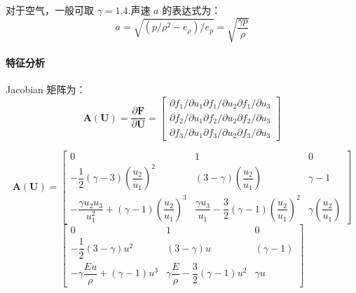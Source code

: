 \documentclass{article}
\numberwithin{equation}{subsection}    %
\begin{document}
\begin{appendix}
    对于空气，一般可取 $\gamma=1.4$.声速 $a$ 的表达式为：
    \begin{equation}
        a=\sqrt{\left(p / \rho^{2}-e_{\rho}\right) / e_{p}}=\sqrt{\dfrac{\gamma p}{\rho}}
    \end{equation}

    \paragraph{特征分析}
    Jacobian 矩阵为：
    \begin{equation}
        \mathbf{A}(\mathbf{U})=\dfrac{\partial \mathbf{F}}{\partial \mathbf{U}}=\left[\begin{array}{l}
                \partial f_{1} / \partial u_{1} \partial f_{1} / \partial u_{2} \partial f_{1} / \partial u_{3} \\
                \partial f_{2} / \partial u_{1} \partial f_{2} / \partial u_{2} \partial f_{2} / \partial u_{3} \\
                \partial f_{3} / \partial u_{1} \partial f_{3} / \partial u_{2} \partial f_{3} / \partial u_{3}
            \end{array}\right]
    \end{equation}

    \begin{equation}
        \mathbf{A}(\mathbf{U})=\begin{bmatrix}
            0                                                                                      & 1                                                                                       & 0                                       \\
            -\dfrac{1}{2}(\gamma-3)\left(\dfrac{u_{2}}{u_{1}}\right)^{2}                           & (3-\gamma)\left(\dfrac{u_{2}}{u_{1}}\right)                                             & \gamma-1                                \\
            -\dfrac{\gamma u_{2} u_{3}}{u_{1}^{2}}+(\gamma-1)\left(\dfrac{u_{2}}{u_{1}}\right)^{3} & \dfrac{\gamma u_{3}}{u_{1}}-\dfrac{3}{2}(\gamma-1)\left(\dfrac{u_{2}}{u_{1}}\right)^{2} & \gamma\left(\dfrac{u_{2}}{u_{1}}\right)
        \end{bmatrix}
    \end{equation}
    \begin{equation}
        \begin{bmatrix}
            0                                          & 1                                                   & 0          \\
            -\dfrac{1}{2}(3-\gamma) u^{2}              & (3-\gamma) u                                        & (\gamma-1) \\
            -\gamma \dfrac{E u}{\rho}+(\gamma-1) u^{3} & \gamma \dfrac{E}{\rho}-\dfrac{3}{2}(\gamma-1) u^{2} & \gamma u
        \end{bmatrix}
    \end{equation}


\end{appendix}
\end{document}
